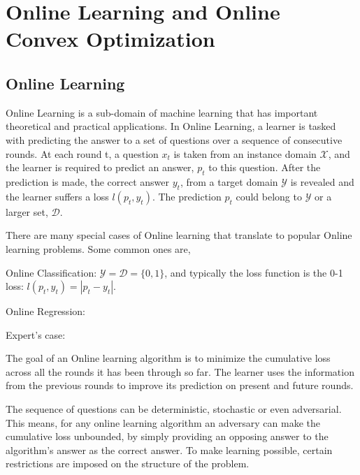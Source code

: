 

%


\newtheorem{definition}{Definition}
\newtheorem{lemma}{Lemma}

\chapter{Online Learning and Online Convex Optimization}

\section{Online Learning}

Online Learning is a sub-domain of machine learning that has important theoretical and practical applications. 
In Online Learning, a learner is tasked with predicting the answer to a set of questions over a sequence of consecutive rounds.
At each round t, a question $x_t$ is taken from an instance domain $\mathcal{X}$, and the learner is required to predict 
an answer, $p_t$ to this question. After the prediction is made, the correct answer $y_t$, from a target domain $\mathcal{Y}$ 
is revealed and the learner suffers a loss $l(p_t, y_t)$. The prediction $p_t$ could belong to $\mathcal{Y}$ or a larger set, 
$\mathcal{D}$.

There are many special cases of Online learning that translate to popular Online learning problems. Some common ones are,

Online Classification: $\mathcal{Y}=\mathcal{D}=\{0,1\}$, and typically the loss function is the 0-1 loss: $l(p_t, y_t)=|p_t - y_t|$.

Online Regression:

Expert's case:


The goal of an Online learning algorithm is to minimize the cumulative loss across all the rounds it has been through so far.
The learner uses the information from the previous rounds to improve its prediction on present and future rounds.

The sequence of questions can be deterministic, stochastic or even adversarial. This means, for any online learning algorithm 
an adversary can make the cumulative loss unbounded, by simply providing an opposing answer to the algorithm's answer as the correct 
answer. To make learning possible, certain restrictions are imposed on the structure of the problem.

